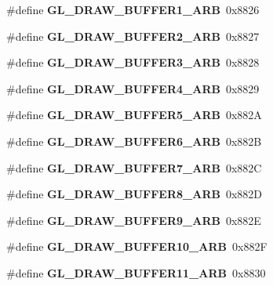\begin{DoxyCompactItemize}
\item 
\#define {\bfseries G\+L\+\_\+\+D\+R\+A\+W\+\_\+\+B\+U\+F\+F\+E\+R1\+\_\+\+A\+R\+B}~0x8826\label{_s_d_l__opengl_8h_a2b9b1aad21cfcef7c75d5017e94f7519}

\item 
\#define {\bfseries G\+L\+\_\+\+D\+R\+A\+W\+\_\+\+B\+U\+F\+F\+E\+R2\+\_\+\+A\+R\+B}~0x8827\label{_s_d_l__opengl_8h_a326a36b2357e5e36600cd65d9f76abac}

\item 
\#define {\bfseries G\+L\+\_\+\+D\+R\+A\+W\+\_\+\+B\+U\+F\+F\+E\+R3\+\_\+\+A\+R\+B}~0x8828\label{_s_d_l__opengl_8h_adc5ddc92dc3e28fa678a7d648fda123d}

\item 
\#define {\bfseries G\+L\+\_\+\+D\+R\+A\+W\+\_\+\+B\+U\+F\+F\+E\+R4\+\_\+\+A\+R\+B}~0x8829\label{_s_d_l__opengl_8h_a53a7d2fb097f31fb39d5346150da3a2c}

\item 
\#define {\bfseries G\+L\+\_\+\+D\+R\+A\+W\+\_\+\+B\+U\+F\+F\+E\+R5\+\_\+\+A\+R\+B}~0x882\+A\label{_s_d_l__opengl_8h_a30e3def5005860a8d90d947592212ae6}

\item 
\#define {\bfseries G\+L\+\_\+\+D\+R\+A\+W\+\_\+\+B\+U\+F\+F\+E\+R6\+\_\+\+A\+R\+B}~0x882\+B\label{_s_d_l__opengl_8h_a6483a20f6b0fd121b9e61b43c3d8de27}

\item 
\#define {\bfseries G\+L\+\_\+\+D\+R\+A\+W\+\_\+\+B\+U\+F\+F\+E\+R7\+\_\+\+A\+R\+B}~0x882\+C\label{_s_d_l__opengl_8h_ac24a3235fdbeace814538f0370d4c42f}

\item 
\#define {\bfseries G\+L\+\_\+\+D\+R\+A\+W\+\_\+\+B\+U\+F\+F\+E\+R8\+\_\+\+A\+R\+B}~0x882\+D\label{_s_d_l__opengl_8h_a7020c95bdbf5ec3ad6993945376a8824}

\item 
\#define {\bfseries G\+L\+\_\+\+D\+R\+A\+W\+\_\+\+B\+U\+F\+F\+E\+R9\+\_\+\+A\+R\+B}~0x882\+E\label{_s_d_l__opengl_8h_aa46c0e64a961e77ef54866406b05fdb3}

\item 
\#define {\bfseries G\+L\+\_\+\+D\+R\+A\+W\+\_\+\+B\+U\+F\+F\+E\+R10\+\_\+\+A\+R\+B}~0x882\+F\label{_s_d_l__opengl_8h_a8cd4f2ebe43c2cf24a5aa8d11d93a36a}

\item 
\#define {\bfseries G\+L\+\_\+\+D\+R\+A\+W\+\_\+\+B\+U\+F\+F\+E\+R11\+\_\+\+A\+R\+B}~0x8830\label{_s_d_l__opengl_8h_a6c9c2cbd6317d63c1fb479a3e752e529}


\end{DoxyCompactItemize}
